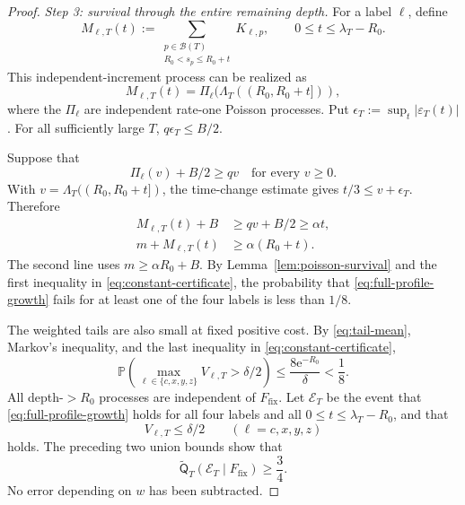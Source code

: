 \documentclass[11pt]{article}
\numberwithin{equation}{section}
\theoremstyle{plain}
\newcommand{\Pp}{\mathbb P}
\newcommand{\1}{\mathbf 1}
\newcommand{\e}{\mathrm e}
\newcommand{\cB}{\mathcal B}
\begin{document}
\begin{proof}
\smallskip
\noindent\emph{Step 3: survival through the entire remaining depth.}
For a label $\ell$, define
\[
 M_{\ell,T}(t):=
 \sum_{\substack{p\in\cB(T)\\R_0<s_p\le R_0+t}}K_{\ell,p},
 \qquad 0\le t\le\lambda_T-R_0.
\]
This independent-increment process can be realized as
\begin{equation}\label{eq:poisson-time-change}
 M_{\ell,T}(t)
 =\Pi_\ell(\Lambda_T((R_0,R_0+t])),
\end{equation}
where the $\Pi_\ell$ are independent rate-one Poisson processes.  Put
$\epsilon_T:=\sup_t|\varepsilon_T(t)|$.  For all sufficiently large $T$,
$q\epsilon_T\le B/2$.

Suppose that
\begin{equation}\label{eq:survival-event}
 \Pi_\ell(v)+B/2\ge qv
 \quad\text{for every }v\ge0.
\end{equation}
With $v=\Lambda_T((R_0,R_0+t])$, the time-change estimate gives
$t/3\le v+\epsilon_T$.  Therefore
\begin{align}
 M_{\ell,T}(t)+B
 &\ge qv+B/2
 \ge \alpha t,                                      \label{eq:profile-growth}\\
 m+M_{\ell,T}(t)
 &\ge \alpha(R_0+t).                                 \label{eq:full-profile-growth}
\end{align}
The second line uses $m\ge\alpha R_0+B$.  By
Lemma~\ref{lem:poisson-survival} and the first inequality in
\eqref{eq:constant-certificate}, the probability that
\eqref{eq:full-profile-growth} fails for at least one of the four labels
is less than $1/8$.

The weighted tails are also small at fixed positive cost.  By
\eqref{eq:tail-mean}, Markov's inequality, and the last inequality in
\eqref{eq:constant-certificate},
\begin{equation}\label{eq:tail-union}
 \Pp\left(
 \max_{\ell\in\{c,x,y,z\}}V_{\ell,T}>\delta/2
 \right)
 \le\frac{8\e^{-R_0}}{\delta}<\frac18.
\end{equation}
All depth-$>R_0$ processes are independent of $F_{\mathrm{fix}}$.  Let
$\mathcal E_T$ be the event that \eqref{eq:full-profile-growth} holds for
all four labels and all $0\le t\le\lambda_T-R_0$, and that
\begin{equation}\label{eq:small-tails}
 V_{\ell,T}\le\delta/2
 \qquad(\ell=c,x,y,z)
\end{equation}
holds.  The preceding two union bounds show that
\begin{equation}\label{eq:profile-tail-success}
 \widetilde{\mathsf Q}_T(\mathcal E_T\mid F_{\mathrm{fix}})
 \ge\frac34.
\end{equation}
No error depending on $w$ has been subtracted.


\end{proof}
\end{document}
